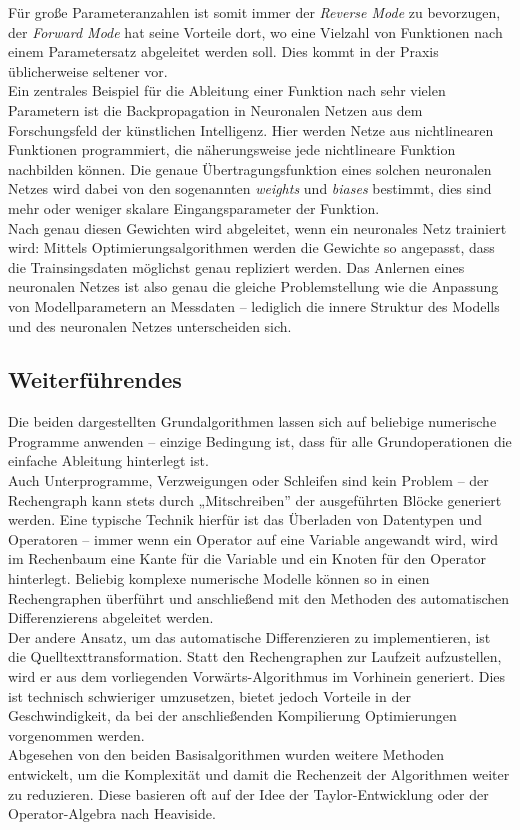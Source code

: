 \documentclass{scrartcl}
\begin{document}
Für große Parameteranzahlen ist somit immer der \emph{Reverse Mode} zu bevorzugen, der \emph{Forward Mode} hat seine Vorteile dort, wo eine Vielzahl von Funktionen nach einem Parametersatz abgeleitet werden soll. Dies kommt in der Praxis üblicherweise seltener vor.\\
Ein zentrales Beispiel für die Ableitung einer Funktion nach sehr vielen Parametern ist die Backpropagation in Neuronalen Netzen aus dem Forschungsfeld der künstlichen Intelligenz. Hier werden Netze aus nichtlinearen Funktionen programmiert, die näherungsweise jede nichtlineare Funktion nachbilden können. Die genaue Übertragungsfunktion eines solchen neuronalen Netzes wird dabei von den sogenannten \emph{weights} und \emph{biases} bestimmt, dies sind mehr oder weniger skalare Eingangsparameter der Funktion.\\
Nach genau diesen Gewichten wird abgeleitet, wenn ein neuronales Netz trainiert wird: Mittels Optimierungsalgorithmen werden die Gewichte so angepasst, dass die Trainsingsdaten möglichst genau repliziert werden. Das Anlernen eines neuronalen Netzes ist also genau die gleiche Problemstellung  wie die Anpassung von Modellparametern an Messdaten -- lediglich die innere Struktur des Modells und des neuronalen Netzes unterscheiden sich.\\
\subsection{Weiterführendes}
Die beiden dargestellten Grundalgorithmen lassen sich auf beliebige numerische Programme anwenden -- einzige Bedingung ist, dass für alle Grundoperationen die einfache Ableitung hinterlegt ist.\\
Auch Unterprogramme, Verzweigungen oder Schleifen sind kein Problem -- der Rechengraph kann stets durch „Mitschreiben” der ausgeführten Blöcke generiert werden. Eine typische Technik hierfür ist das Überladen von Datentypen und Operatoren -- immer wenn ein Operator auf eine Variable angewandt wird, wird im Rechenbaum eine Kante für die Variable und ein Knoten für den Operator hinterlegt. Beliebig komplexe numerische Modelle können so in einen Rechengraphen überführt und anschließend mit den Methoden des automatischen Differenzierens abgeleitet werden.\\
Der andere Ansatz, um das automatische Differenzieren zu implementieren, ist die Quelltexttransformation. Statt den Rechengraphen zur Laufzeit aufzustellen, wird er aus dem vorliegenden Vorwärts-Algorithmus im Vorhinein generiert. Dies ist technisch schwieriger umzusetzen, bietet jedoch Vorteile in der Geschwindigkeit, da bei der anschließenden Kompilierung Optimierungen vorgenommen werden.\\
Abgesehen von den beiden Basisalgorithmen wurden weitere Methoden entwickelt, um die Komplexität und damit die Rechenzeit der Algorithmen weiter zu reduzieren. Diese basieren oft auf der Idee der Taylor-Entwicklung oder der Operator-Algebra nach Heaviside.
\end{document}
